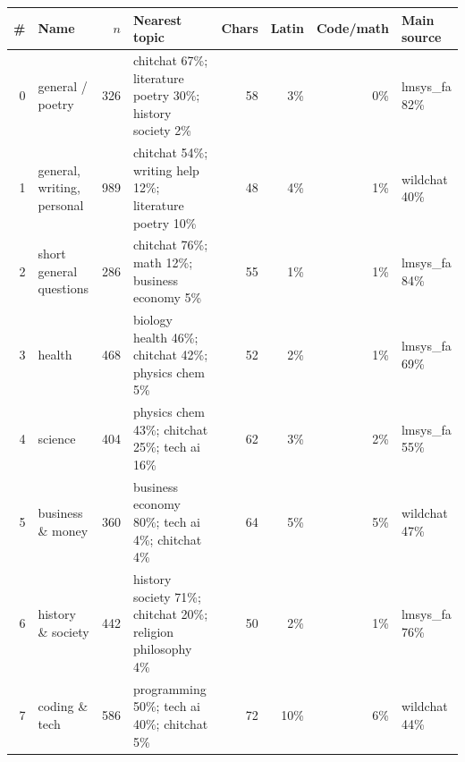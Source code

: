 \begin{tabular}{rlr>{\raggedright\arraybackslash}p{5.0cm}rrrl}
\toprule
\# & Name & $n$ & Nearest topic & Chars & Latin & Code/math & Main source \\
\midrule
0 & general / poetry & 326 & \footnotesize chitchat 67\%; literature poetry 30\%; history society 2\% & 58 & 3\% & 0\% & lmsys\_fa 82\% \\
1 & general, writing, personal & 989 & \footnotesize chitchat 54\%; writing help 12\%; literature poetry 10\% & 48 & 4\% & 1\% & wildchat 40\% \\
2 & short general questions & 286 & \footnotesize chitchat 76\%; math 12\%; business economy 5\% & 55 & 1\% & 1\% & lmsys\_fa 84\% \\
3 & health & 468 & \footnotesize biology health 46\%; chitchat 42\%; physics chem 5\% & 52 & 2\% & 1\% & lmsys\_fa 69\% \\
4 & science & 404 & \footnotesize physics chem 43\%; chitchat 25\%; tech ai 16\% & 62 & 3\% & 2\% & lmsys\_fa 55\% \\
5 & business \& money & 360 & \footnotesize business economy 80\%; tech ai 4\%; chitchat 4\% & 64 & 5\% & 5\% & wildchat 47\% \\
6 & history \& society & 442 & \footnotesize history society 71\%; chitchat 20\%; religion philosophy 4\% & 50 & 2\% & 1\% & lmsys\_fa 76\% \\
7 & coding \& tech & 586 & \footnotesize programming 50\%; tech ai 40\%; chitchat 5\% & 72 & 10\% & 6\% & wildchat 44\% \\
\bottomrule
\end{tabular}

